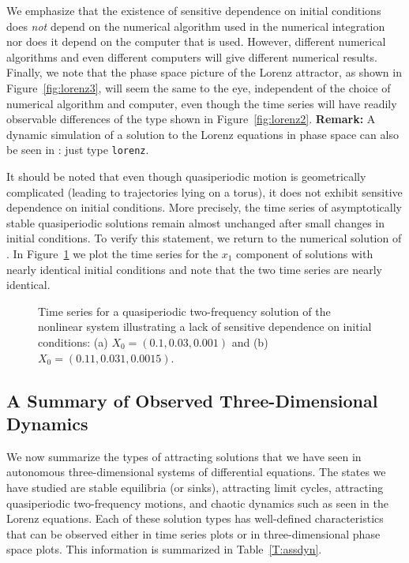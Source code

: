 \documentclass{ximera}
\begin{document}
We emphasize that the existence of sensitive dependence on initial conditions 
does {\em not\/} depend on the numerical algorithm used in the numerical 
integration nor does it depend on the computer that is used.  However, 
different numerical algorithms and even different computers will give 
different numerical results.   Finally, we note that the phase space picture 
of the Lorenz attractor, as shown in 
Figure~\ref{fig:lorenz3}, will seem the same to the eye, independent of the 
choice of numerical algorithm and computer,
even though the time series will have readily observable differences of the
type shown in Figure~\ref{fig:lorenz2}.  {\bf Remark:}  A dynamic simulation 
of a solution to the Lorenz equations in phase space can also be seen in 
\Matlabp: just type {\tt lorenz}.

It should be noted that even though quasiperiodic motion is geometrically 
complicated (leading to trajectories lying on a torus), it does not exhibit
sensitive dependence on initial conditions.  More precisely, the time series 
of asymptotically stable quasiperiodic solutions remain almost unchanged 
after small changes in initial conditions.  To verify this statement, we 
return to the numerical solution of .  In Figure~\ref{F:tor3tsab}
we plot the time series for the $x_1$ component of solutions with nearly 
identical initial conditions and note that the two time series are nearly 
identical.

\begin{figure}[htb]
   \centerline{%
   }
   \caption{Time series for a quasiperiodic two-frequency solution of the 
	nonlinear system \protect{} illustrating a lack of sensitive 
	dependence on initial conditions: (a) $X_0=(0.1,0.03,0.001)$ and (b) 
	$X_0=(0.11,0.031,0.0015)$.}
   \label{F:tor3tsab}
\end{figure}

\subsection*{A Summary of Observed Three-Dimensional Dynamics}

We now summarize the types of attracting solutions that we have seen in
autonomous three-dimensional systems of differential equations.  The states
we have studied are stable equilibria (or sinks), attracting limit cycles,
attracting quasiperiodic two-frequency motions, and chaotic dynamics such as
seen in the Lorenz equations.  Each of these solution types has well-defined
characteristics that can be observed either in time series plots or in
three-dimensional phase space plots.  This information is summarized in 
Table~\ref{T:assdyn}.
\end{document}
